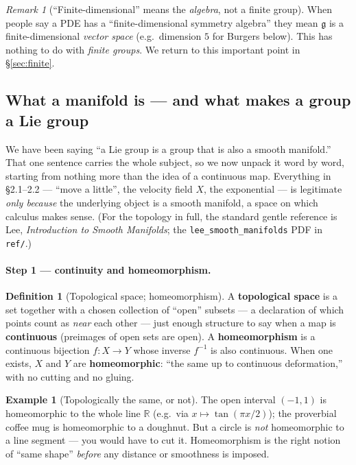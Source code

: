\documentclass[11pt]{article}
\theoremstyle{definition}
\newtheorem{definition}{Definition}[section]
\newtheorem{example}{Example}[section]
\theoremstyle{remark}
\newtheorem{remark}{Remark}[section]
\newcommand{\g}{\mathfrak{g}}
\newcommand{\R}{\mathbb{R}}
\begin{document}
\begin{remark}[``Finite-dimensional'' means the \emph{algebra}, not a finite group]
When people say a PDE has a ``finite-dimensional symmetry algebra'' they mean $\g$ is a finite-dimensional
\emph{vector space} (e.g.\ dimension $5$ for Burgers below). This has nothing to do with \emph{finite
groups}. We return to this important point in \S\ref{sec:finite}.
\end{remark}

\subsection{What a manifold is --- and what makes a group a Lie group}
\label{sec:manifold}

We have been saying ``a Lie group is a group that is also a smooth manifold.'' That one sentence carries
the whole subject, so we now unpack it word by word, starting from nothing more than the idea of a
continuous map. Everything in \S2.1--2.2 --- ``move a little'', the velocity field $X$, the exponential ---
is legitimate \emph{only because} the underlying object is a smooth manifold, a space on which calculus
makes sense. (For the topology in full, the standard gentle reference is Lee,
\emph{Introduction to Smooth Manifolds}; the \texttt{lee\_smooth\_manifolds} PDF in \texttt{ref/}.)

\paragraph{Step 1 --- continuity and homeomorphism.}
\begin{definition}[Topological space; homeomorphism]
A \textbf{topological space} is a set together with a chosen collection of ``open'' subsets --- a
declaration of which points count as \emph{near} each other --- just enough structure to say when a map is
\textbf{continuous} (preimages of open sets are open). A \textbf{homeomorphism} is a continuous bijection
$f:X\to Y$ whose inverse $f^{-1}$ is also continuous. When one exists, $X$ and $Y$ are
\textbf{homeomorphic}: ``the same up to continuous deformation,'' with no cutting and no gluing.
\end{definition}

\begin{example}[Topologically the same, or not]
The open interval $(-1,1)$ is homeomorphic to the whole line $\R$ (e.g.\ via $x\mapsto\tan(\pi x/2)$); the
proverbial coffee mug is homeomorphic to a doughnut. But a circle is \emph{not} homeomorphic to a line
segment --- you would have to cut it. Homeomorphism is the right notion of ``same shape'' \emph{before} any
distance or smoothness is imposed.
\end{example}
\end{document}
